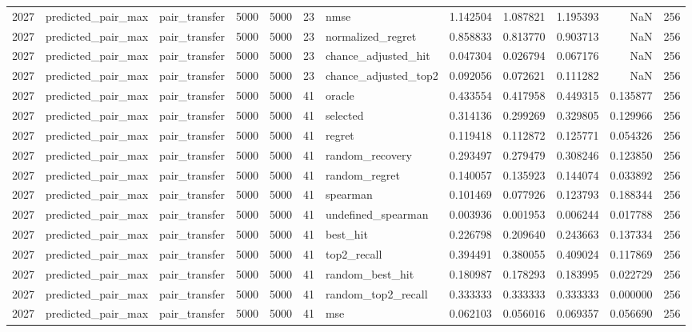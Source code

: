 \begin{tabular}{rllrrrlrrrrr}
2027 & predicted_pair_max & pair_transfer & 5000 & 5000 & 23 & nmse & 1.142504 & 1.087821 & 1.195393 & NaN & 256 \\
2027 & predicted_pair_max & pair_transfer & 5000 & 5000 & 23 & normalized_regret & 0.858833 & 0.813770 & 0.903713 & NaN & 256 \\
2027 & predicted_pair_max & pair_transfer & 5000 & 5000 & 23 & chance_adjusted_hit & 0.047304 & 0.026794 & 0.067176 & NaN & 256 \\
2027 & predicted_pair_max & pair_transfer & 5000 & 5000 & 23 & chance_adjusted_top2 & 0.092056 & 0.072621 & 0.111282 & NaN & 256 \\
2027 & predicted_pair_max & pair_transfer & 5000 & 5000 & 41 & oracle & 0.433554 & 0.417958 & 0.449315 & 0.135877 & 256 \\
2027 & predicted_pair_max & pair_transfer & 5000 & 5000 & 41 & selected & 0.314136 & 0.299269 & 0.329805 & 0.129966 & 256 \\
2027 & predicted_pair_max & pair_transfer & 5000 & 5000 & 41 & regret & 0.119418 & 0.112872 & 0.125771 & 0.054326 & 256 \\
2027 & predicted_pair_max & pair_transfer & 5000 & 5000 & 41 & random_recovery & 0.293497 & 0.279479 & 0.308246 & 0.123850 & 256 \\
2027 & predicted_pair_max & pair_transfer & 5000 & 5000 & 41 & random_regret & 0.140057 & 0.135923 & 0.144074 & 0.033892 & 256 \\
2027 & predicted_pair_max & pair_transfer & 5000 & 5000 & 41 & spearman & 0.101469 & 0.077926 & 0.123793 & 0.188344 & 256 \\
2027 & predicted_pair_max & pair_transfer & 5000 & 5000 & 41 & undefined_spearman & 0.003936 & 0.001953 & 0.006244 & 0.017788 & 256 \\
2027 & predicted_pair_max & pair_transfer & 5000 & 5000 & 41 & best_hit & 0.226798 & 0.209640 & 0.243663 & 0.137334 & 256 \\
2027 & predicted_pair_max & pair_transfer & 5000 & 5000 & 41 & top2_recall & 0.394491 & 0.380055 & 0.409024 & 0.117869 & 256 \\
2027 & predicted_pair_max & pair_transfer & 5000 & 5000 & 41 & random_best_hit & 0.180987 & 0.178293 & 0.183995 & 0.022729 & 256 \\
2027 & predicted_pair_max & pair_transfer & 5000 & 5000 & 41 & random_top2_recall & 0.333333 & 0.333333 & 0.333333 & 0.000000 & 256 \\
2027 & predicted_pair_max & pair_transfer & 5000 & 5000 & 41 & mse & 0.062103 & 0.056016 & 0.069357 & 0.056690 & 256 \\

\end{tabular}
